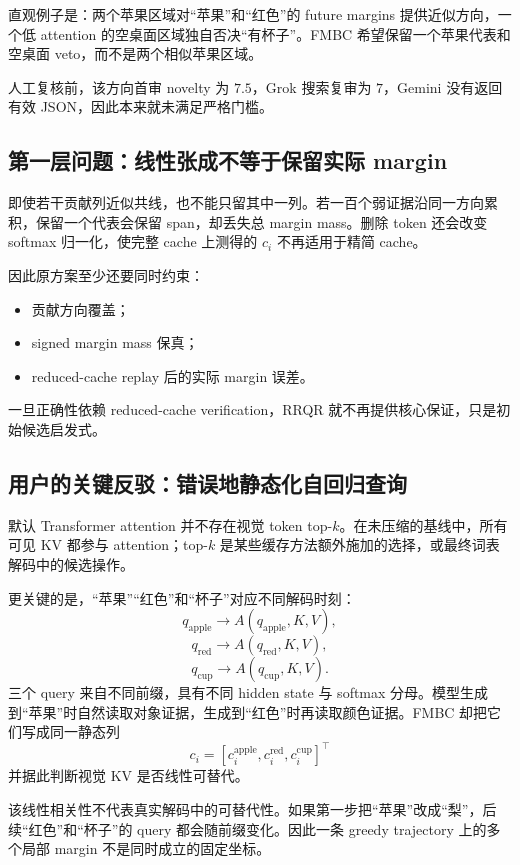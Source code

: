 \documentclass[UTF8,zihao=-4,a4paper]{ctexart}
\begin{document}
直观例子是：两个苹果区域对“苹果”和“红色”的 future margins 提供近似方向，一个低 attention 的空桌面区域独自否决“有杯子”。FMBC 希望保留一个苹果代表和空桌面 veto，而不是两个相似苹果区域。

人工复核前，该方向首审 novelty 为 $7.5$，Grok 搜索复审为 $7$，Gemini 没有返回有效 JSON，因此本来就未满足严格门槛。

\subsection{第一层问题：线性张成不等于保留实际 margin}

即使若干贡献列近似共线，也不能只留其中一列。若一百个弱证据沿同一方向累积，保留一个代表会保留 span，却丢失总 margin mass。删除 token 还会改变 softmax 归一化，使完整 cache 上测得的 $c_i$ 不再适用于精简 cache。

因此原方案至少还要同时约束：

\begin{itemize}
  \item 贡献方向覆盖；
  \item signed margin mass 保真；
  \item reduced-cache replay 后的实际 margin 误差。
\end{itemize}

一旦正确性依赖 reduced-cache verification，RRQR 就不再提供核心保证，只是初始候选启发式。

\subsection{用户的关键反驳：错误地静态化自回归查询}

默认 Transformer attention 并不存在视觉 token top-$k$。在未压缩的基线中，所有可见 KV 都参与 attention；top-$k$ 是某些缓存方法额外施加的选择，或最终词表解码中的候选操作。

更关键的是，“苹果”“红色”和“杯子”对应不同解码时刻：
\[
q_{\mathrm{apple}}\rightarrow A(q_{\mathrm{apple}},K,V),
\]
\[
q_{\mathrm{red}}\rightarrow A(q_{\mathrm{red}},K,V),
\]
\[
q_{\mathrm{cup}}\rightarrow A(q_{\mathrm{cup}},K,V).
\]
三个 query 来自不同前缀，具有不同 hidden state 与 softmax 分母。模型生成到“苹果”时自然读取对象证据，生成到“红色”时再读取颜色证据。FMBC 却把它们写成同一静态列
\[
c_i=
[c_i^{\mathrm{apple}},
c_i^{\mathrm{red}},
c_i^{\mathrm{cup}}]^\top
\]
并据此判断视觉 KV 是否线性可替代。

该线性相关性不代表真实解码中的可替代性。如果第一步把“苹果”改成“梨”，后续“红色”和“杯子”的 query 都会随前缀变化。因此一条 greedy trajectory 上的多个局部 margin 不是同时成立的固定坐标。
\end{document}
